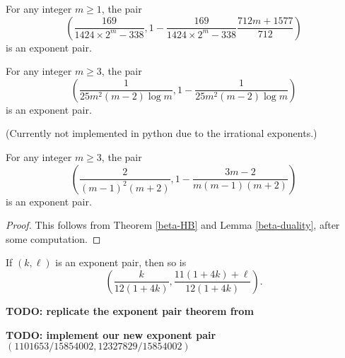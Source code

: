 \literature
{}


\begin{theorem}\label{huxley_exp_pair}\cite[Table 17.3]{huxley_area_1996}  For any integer $m \geq 1$, the pair
    $$ \left(\frac{169}{1424 \times 2^m - 338}, 1 - \frac{169}{1424 \times 2^m - 338} \frac{712m+1577}{712}\right)$$
is an exponent pair.
\end{theorem}

\literature
{}

\begin{theorem}\label{heath-brown_exp_pair_1996}\cite[(6.17.4)]{titchmarsh_theory_1986}  For any integer $m \geq 3$, the pair
$$ \left(\frac{1}{25m^2 (m-2) \log m}, 1 - \frac{1}{25 m^2 (m-2) \log m}\right)$$
is an exponent pair.
\end{theorem}

(Currently not implemented in python due to the irrational exponents.)

\begin{theorem}\label{heath-brown_exp_pair_2017}\cite[Theorem 2]{heathbrown_new_2017}
For any integer $m \geq 3$, the pair
$$ \left(\frac{2}{(m-1)^2(m+2)}, 1 - \frac{3m-2}{m(m-1)(m+2)}\right)$$
is an exponent pair.
\end{theorem}

\literature
{}

\begin{proof} This follows from Theorem \ref{beta-HB} and Lemma \ref{beta-duality}, after some computation.
\end{proof}


\begin{theorem}\label{sargos_C}\cite[Theorem 5]{sargos_analog_2003}  If $(k,\ell)$ is an exponent pair, then so is
    $$ \left(\frac{k}{12(1+4k)}, \frac{11(1+4k)+\ell}{12(1+4k)}\right).$$
\end{theorem}

\literature
{}

{\bf TODO: replicate the exponent pair theorem from \cite{trudgian-yang}}

{\bf TODO: implement our new exponent pair $(1101653/15854002, 12327829/15854002)$}
